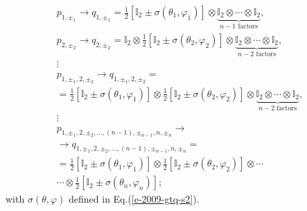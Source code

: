 \begin{equation}
\begin{split}
p_{1,\pm_1 }  \rightarrow  q_{1,\pm_1 }
=
{\frac{1}{2}}\left[{\mathbb I}_2 \pm {\sigma}( \theta_1,\varphi_1 )\right] \otimes
\underbrace{\mathbb{I}_2\otimes  \cdots \otimes  \mathbb{I}_2}_{\text{$n-1$ factors}},
\\
p_{2,\pm_2 }  \rightarrow  q_{2,\pm_2 }
 =
\mathbb{I}_2 \otimes  {\frac{1}{2}}\left[{\mathbb I}_2 \pm {\sigma}( \theta_2,\varphi_2 )\right] \otimes
\underbrace{\mathbb{I}_2\otimes  \cdots \otimes  \mathbb{I}_2}_{\text{$n-2$ factors}},
\\
\vdots
\\
p_{1, \pm_1 ,2, \pm_2 } \rightarrow  q_{1, \pm_1 ,2, \pm_2 }
=  \\=
{\frac{1}{2}}\left[{\mathbb I}_2 \pm {\sigma}( \theta_1,\varphi_1 )\right]
\otimes
{\frac{1}{2}}\left[{\mathbb I}_2 \pm {\sigma}( \theta_2,\varphi_2 )\right] \otimes
\underbrace{\mathbb{I}_2\otimes  \cdots \otimes  \mathbb{I}_2}_{\text{$n-2$ factors}},
\\
\vdots
\\
p_{1,\pm_1 ,2,\pm_2 ,\ldots, (n-1),\pm_{n-1} ,n,\pm_n } \rightarrow
\\ \rightarrow  q_{1,\pm_1 ,2,\pm_2 ,\ldots, (n-1),\pm_{n-1} ,n,\pm_n }
= \\
=
{\frac{1}{2}}\left[{\mathbb I}_2 \pm {\sigma}( \theta_{1},\varphi_{1} )\right]
\otimes
{\frac{1}{2}}\left[{\mathbb I}_2 \pm {\sigma}( \theta_{2},\varphi_{2} )\right]
\otimes
\cdots
\\
\cdots  \otimes
{\frac{1}{2}}\left[{\mathbb I}_2 \pm {\sigma}( \theta_n,\varphi_n )\right];
\end{split}
\label{2017-qbounds-e2}
\end{equation}
with $\sigma ( \theta ,\varphi  )$
defined in Eq.(\ref{e-2009-gtq-s2}).

